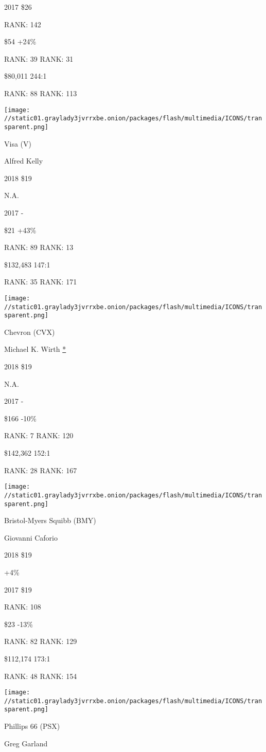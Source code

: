 2017 \$26

RANK: 142

 \$54 +24\%

RANK: 39 RANK: 31

 \$80,011 244:1

RANK: 88 RANK: 113

\texttt{[image: //static01.graylady3jvrrxbe.onion/packages/flash/multimedia/ICONS/transparent.png]}

Visa (V)

Alfred Kelly \protect\hyperlink{g-footnotes}{}

2018 \$19

 N.A.

2017 -

 \$21 +43\%

RANK: 89 RANK: 13

 \$132,483 147:1

RANK: 35 RANK: 171

\texttt{[image: //static01.graylady3jvrrxbe.onion/packages/flash/multimedia/ICONS/transparent.png]}

Chevron (CVX)

Michael K. Wirth \protect\hyperlink{g-footnotes}{*}

2018 \$19

 N.A.

2017 -

 \$166 -10\%

RANK: 7 RANK: 120

 \$142,362 152:1

RANK: 28 RANK: 167

\texttt{[image: //static01.graylady3jvrrxbe.onion/packages/flash/multimedia/ICONS/transparent.png]}

Bristol-Myers Squibb (BMY)

Giovanni Caforio \protect\hyperlink{g-footnotes}{}

2018 \$19

 +4\%

2017 \$19

RANK: 108

 \$23 -13\%

RANK: 82 RANK: 129

 \$112,174 173:1

RANK: 48 RANK: 154

\texttt{[image: //static01.graylady3jvrrxbe.onion/packages/flash/multimedia/ICONS/transparent.png]}

Phillips 66 (PSX)

Greg Garland \protect\hyperlink{g-footnotes}{}


